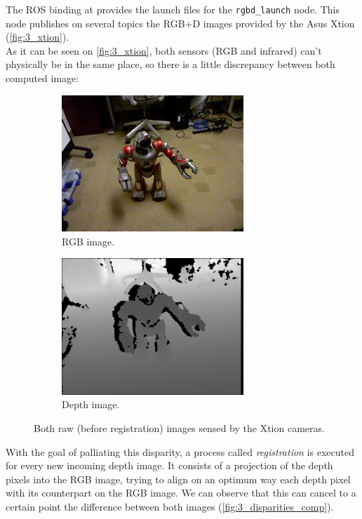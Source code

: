 		The ROS binding at \cite{openni2-doc} provides the launch files for the \texttt{rgbd\_launch} node. This node publishes on several topics the RGB+D images provided by the Asus Xtion (\autoref{fig:3_xtion}).\\
		

		
		As it can be seen on \autoref{fig:3_xtion}, both sensors (RGB and infrared) can't physically be in the same place, so there is a little discrepancy between both computed image:
		
		\begin{figure}[h!]
			\centering
			\begin{subfigure}[h]{0.4\linewidth}
				\centering
				\includegraphics[width=2.7in]{images/rgb_before}
				\caption{RGB image.}
				\label{fig:3_rgb_bef_reg}
			\end{subfigure}
			\hfill
			\begin{subfigure}[h]{0.4\linewidth}
				\centering
				\includegraphics[width=2.7in]{images/depth_before}
				\caption{Depth image.}
				\label{fig:3_depth_bef_reg}
			\end{subfigure}
			
			\caption{Both raw (before registration) images sensed by the Xtion cameras.}
			\label{fig:3_bef_reg}
		\end{figure}
		
		With the goal of palliating this disparity, a process called \emph{registration} is executed for every new incoming depth image. It consists of a projection of the depth pixels into the RGB image, trying to align on an optimum way each depth pixel with its counterpart on the RGB image. We can observe that this can cancel to a certain point the difference between both images (\autoref{fig:3_disparities_comp}).
		
